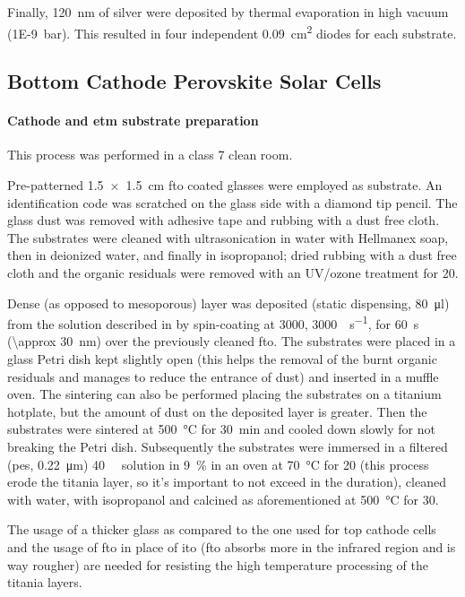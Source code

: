 			Finally, \SI{120}{\nm} of silver were deposited by thermal evaporation in high vacuum (\SI{1E-9}{\bar}). This resulted in four independent \SI{0.09}{\cm\squared} diodes for each substrate.
\label{methods_top_end}
	\subsection{Bottom Cathode Perovskite Solar Cells}

		\paragraph{Cathode and \gls{etm} substrate preparation}
			This process was performed in a class 7 clean room.

			Pre-patterned \SI{1.5 x 1.5}{\cm} \gls{fto} coated glasses were employed as substrate. An identification code was scratched on the glass side with a diamond tip pencil. The glass dust was removed with adhesive tape and rubbing with a dust free cloth. The substrates were cleaned with ultrasonication in water with Hellmanex soap, then in deionized water, and finally in isopropanol; dried rubbing with a dust free cloth and the organic residuals were removed with an UV/ozone treatment for \SI{20}{\min}.

			Dense (as opposed to mesoporous) \TiOtwo layer was deposited (static dispensing, \SI{80}{\ul}) from the solution described in  by spin-coating at \SI{3000}{\rpm}, \SI{3000}{\rpm\per\s}, for \SI{60}{\s} (\SI{\approx 30}{\nm}) over the previously cleaned \gls{fto}. The substrates were placed in a glass Petri dish kept slightly open (this helps the removal of the burnt organic residuals and manages to reduce the entrance of dust) and inserted in a muffle oven. The sintering can also be performed placing the substrates on a titanium hotplate, but the amount of dust on the deposited layer is greater. Then the substrates were sintered at \SI{500}{\celsius} for \SI{30}{\minute} and cooled down slowly for not breaking the Petri dish. Subsequently the substrates were immersed in a filtered (\gls{pes}, \SI{0.22}{\um}) \SI{40}{\milli\Molar}
			 solution in 9~\%  in an oven at \SI{70}{\celsius} for \SI{20}{\min} (this process erode the titania layer, so it's important to not exceed in the duration), cleaned with water, with isopropanol and calcined as aforementioned at \SI{500}{\celsius} for \SI{30}{\min}.

			The usage of a thicker glass as compared to the one used for top cathode cells and the usage of \gls{fto} in place of \gls{ito} (\gls{fto} absorbs more in the infrared region and is way rougher) are needed for resisting the high temperature processing of the titania layers.

